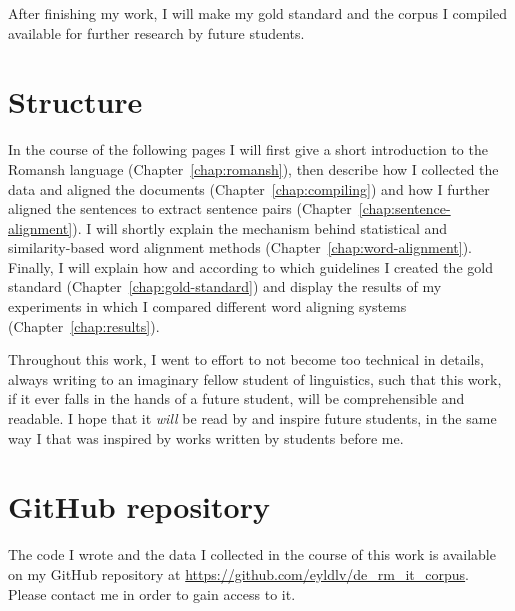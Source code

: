 After finishing my work, I will make my gold standard and the corpus I compiled available for further research by future students.

\section{Structure}
In the course of the following pages I will first give a short introduction to the Romansh language (Chapter~\ref{chap:romansh}), then describe how I collected the data and aligned the documents (Chapter~\ref{chap:compiling}) and how I further aligned the sentences to extract sentence pairs (Chapter~\ref{chap:sentence-alignment}). 
I will shortly explain the mechanism behind statistical and similarity-based word alignment methods (Chapter~\ref{chap:word-alignment}). 
Finally, I will explain how and according to which guidelines I created the gold standard (Chapter~\ref{chap:gold-standard}) and display the results of my experiments in which I compared different word aligning systems (Chapter~\ref{chap:results}).

Throughout this work, I went to effort to not become too technical in details, always writing to an imaginary fellow  student of linguistics, such that this work, if it ever falls in the hands of a future student, will be comprehensible and readable. 
I hope that it \emph{will} be read by and inspire future students, in the same way I that was inspired by works written by students before me.

\section{GitHub repository}
The code I wrote and the data I collected in the course of this work is available on my GitHub repository at \url{https://github.com/eyldlv/de_rm_it_corpus}. 
Please contact me in order to gain access to it.


